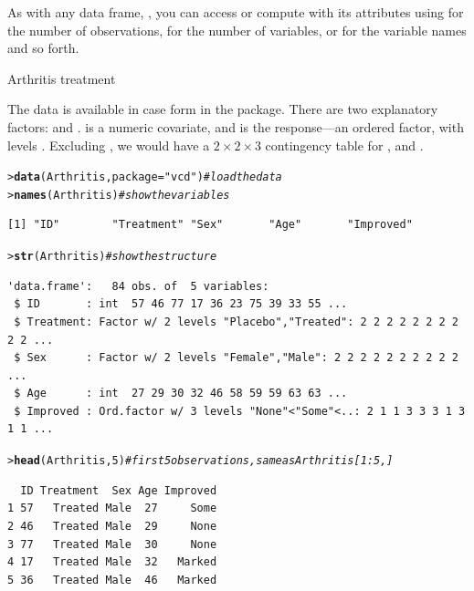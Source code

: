 \documentclass[10pt,krantz2]{krantz}\usepackage[]{graphicx}\usepackage[]{color}
\makeatletter
\newcommand{\hlnum}[1]{\textcolor[rgb]{0.686,0.059,0.569}{#1}}%
\newcommand{\hlstr}[1]{\textcolor[rgb]{0.192,0.494,0.8}{#1}}%
\newcommand{\hlcom}[1]{\textcolor[rgb]{0.678,0.584,0.686}{\textit{#1}}}%
\newcommand{\hlstd}[1]{\textcolor[rgb]{0.345,0.345,0.345}{#1}}%
\newcommand{\hlkwc}[1]{\textcolor[rgb]{0.333,0.667,0.333}{#1}}%
\newcommand{\hlkwd}[1]{\textcolor[rgb]{0.737,0.353,0.396}{\textbf{#1}}}%
\newenvironment{kframe}{%
 \def\at@end@of@kframe{}%
 \ifinner\ifhmode%
  \def\at@end@of@kframe{\end{minipage}}%
  \begin{minipage}{\columnwidth}%
 \fi\fi%
 \def\FrameCommand##1{\hskip\@totalleftmargin \hskip-\fboxsep
 \colorbox{shadecolor}{##1}\hskip-\fboxsep
     \hskip-\linewidth \hskip-\@totalleftmargin \hskip\columnwidth}%
 \MakeFramed {\advance\hsize-\width
   \@totalleftmargin\z@ \linewidth\hsize
   \@setminipage}}%
 {\par\unskip\endMakeFramed%
 \at@end@of@kframe}
\newenvironment{knitrout}{}{} %
\renewenvironment{knitrout}{\small\renewcommand{\baselinestretch}{.85}}{} %
\makeatother
\begin{document}
As with any data frame, , you can access or compute with its attributes using  for the number of observations,
 for the number of variables,
 or  for the variable names and
so forth.

\begin{Example}[ch2-arth]{Arthritis treatment}

The  data is available in case form in the  package.
There are two explanatory factors:  and . 
is a numeric covariate, and  is the response---an ordered factor,
with levels
. Excluding , we would have
a $2 \times 2 \times 3$ contingency table for ,  and .
\begin{knitrout}\footnotesize
{}\color{fgcolor}\begin{kframe}
\begin{alltt}
\hlstd{> }\hlkwd{data}\hlstd{(Arthritis,} \hlkwc{package} \hlstd{=} \hlstr{"vcd"}\hlstd{)}  \hlcom{# load the data}
\hlstd{> }\hlkwd{names}\hlstd{(Arthritis)}      \hlcom{# show the variables}
\end{alltt}
\begin{verbatim}
[1] "ID"        "Treatment" "Sex"       "Age"       "Improved" 
\end{verbatim}
\begin{alltt}
\hlstd{> }\hlkwd{str}\hlstd{(Arthritis)}        \hlcom{# show the structure}
\end{alltt}
\begin{verbatim}
'data.frame':	84 obs. of  5 variables:
 $ ID       : int  57 46 77 17 36 23 75 39 33 55 ...
 $ Treatment: Factor w/ 2 levels "Placebo","Treated": 2 2 2 2 2 2 2 2 2 2 ...
 $ Sex      : Factor w/ 2 levels "Female","Male": 2 2 2 2 2 2 2 2 2 2 ...
 $ Age      : int  27 29 30 32 46 58 59 59 63 63 ...
 $ Improved : Ord.factor w/ 3 levels "None"<"Some"<..: 2 1 1 3 3 3 1 3 1 1 ...
\end{verbatim}
\begin{alltt}
\hlstd{> }\hlkwd{head}\hlstd{(Arthritis,} \hlnum{5}\hlstd{)}    \hlcom{# first 5 observations, same as Arthritis[1:5,]}
\end{alltt}
\begin{verbatim}
  ID Treatment  Sex Age Improved
1 57   Treated Male  27     Some
2 46   Treated Male  29     None
3 77   Treated Male  30     None
4 17   Treated Male  32   Marked
5 36   Treated Male  46   Marked
\end{verbatim}
\end{kframe}
\end{knitrout}
\end{Example}
\end{document}
